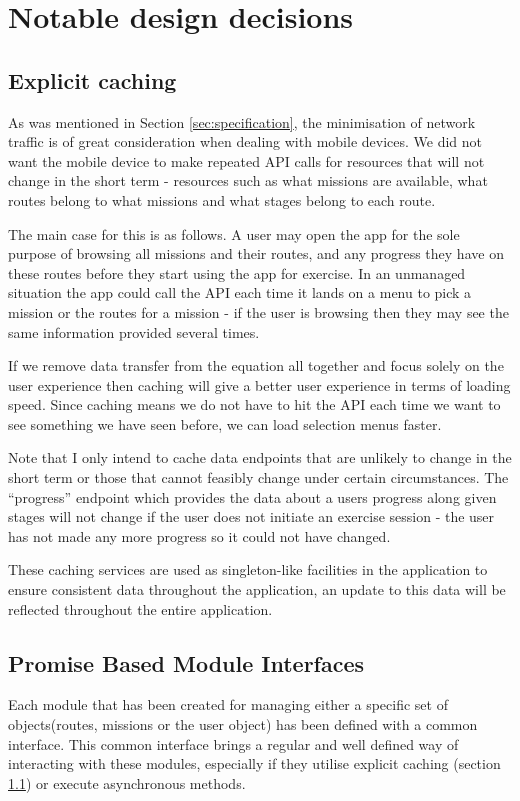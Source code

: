 \section{Notable design decisions}\label{sec:notable}
\subsection{Explicit caching}
\label{sec:explicit_caching}
As was mentioned in Section \ref{sec:specification}, the minimisation of network
traffic is of great consideration when dealing with mobile devices. We
did not want the mobile device to make repeated API calls for
resources that will not change in the short term - resources such as
what missions are available, what routes belong to what missions and
what stages belong to each route. 

The main case for this is as follows. A user may open the app for the
sole purpose of browsing all missions and their routes, and any
progress they have on these routes before they start using the app for
exercise. In an unmanaged situation the app could call the API each
time it lands on a menu to pick a mission or the routes for a mission
- if the user is browsing then they may see the same information
provided several times. 

If we remove data transfer from the equation all together and focus
solely on the user experience then caching will give a better user
experience in terms of loading speed. Since caching means we do not
have to hit the API each time we want to see something we have seen
before, we can load selection menus faster. 

Note that I only intend to cache data endpoints that are unlikely to
change in the short term or those that cannot feasibly change under
certain circumstances. The ``progress'' endpoint which provides the
data about a users progress along given stages will not change if the
user does not initiate an exercise session - the user has not made any
more progress so it could not have changed. 

These caching services are used as singleton-like facilities in the
application to ensure consistent data throughout the application, an
update to this data will be reflected throughout the entire
application. 

\subsection{Promise Based Module Interfaces}
Each module that has been created for managing either a specific set
of objects(routes, missions or the user object) has been defined
with a common interface. This common interface brings a regular
and well defined way of interacting with these modules, especially if
they utilise explicit caching (section \ref{sec:explicit_caching}) or
execute asynchronous methods.

